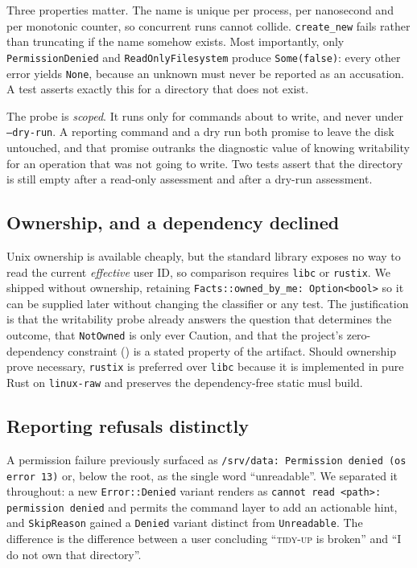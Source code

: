 \documentclass[11pt,a4paper]{article}
\newcommand{\code}[1]{\texttt{\small #1}}
\newcommand{\tool}{\textsc{tidy-up}}
\begin{document}
Three properties matter. The name is unique per process, per nanosecond and per
monotonic counter, so concurrent runs cannot collide. \code{create\_new} fails rather
than truncating if the name somehow exists. Most importantly, only
\code{PermissionDenied} and \code{ReadOnlyFilesystem} produce \code{Some(false)}:
every other error yields \code{None}, because an unknown must never be reported as an
accusation. A test asserts exactly this for a directory that does not exist.

The probe is \emph{scoped}. It runs only for commands about to write, and never under
\code{--dry-run}. A reporting command and a dry run both promise to leave the disk
untouched, and that promise outranks the diagnostic value of knowing writability for
an operation that was not going to write. Two tests assert that the directory is still
empty after a read-only assessment and after a dry-run assessment.

\subsection{Ownership, and a dependency declined}

Unix ownership is available cheaply, but the standard library exposes no way to read
the current \emph{effective} user ID, so comparison requires \code{libc} or
\code{rustix}. We shipped without ownership, retaining
\code{Facts::owned\_by\_me: Option<bool>} so it can be supplied later without changing
the classifier or any test. The justification is that the writability probe already
answers the question that determines the outcome, that \code{NotOwned} is only ever
\textsf{Caution}, and that the project's zero-dependency constraint
() is a stated property of the artifact. Should ownership prove
necessary, \code{rustix} is preferred over \code{libc} because it is implemented in
pure Rust on \code{linux-raw} and preserves the dependency-free static musl build.

\subsection{Reporting refusals distinctly}

A permission failure previously surfaced as \code{/srv/data: Permission denied
(os error 13)} or, below the root, as the single word \enquote{unreadable}. We
separated it throughout: a new \code{Error::Denied} variant renders as
\code{cannot read <path>: permission denied} and permits the command layer to add an
actionable hint, and \code{SkipReason} gained a \code{Denied} variant distinct from
\code{Unreadable}. The difference is the difference between a user concluding
\enquote{\tool{} is broken} and \enquote{I do not own that directory}.
\end{document}

